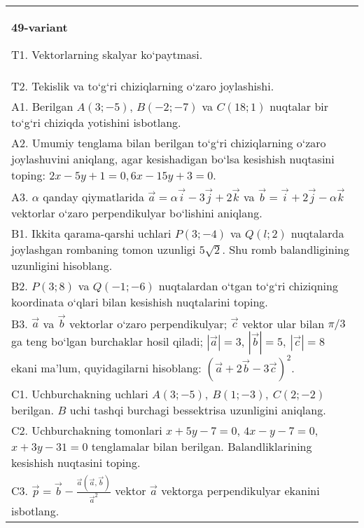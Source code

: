 \documentclass{article}
\begin{document}
\begin{tabular}{m{17cm}}
\textbf{49-variant}
\newline

T1. 
Vektorlarning skalyar ko‘paytmasi.
 \\
T2. 
Tekislik va to‘g‘ri chiziqlarning o‘zaro joylashishi.
 \\
A1. 
Berilgan $A (3; -5) $, $B (-2; -7)$ va
$C (18; 1) $ nuqtalar bir to‘g‘ri chiziqda yotishini isbotlang.
 \\
A2. 
Umumiy tenglama bilan berilgan to‘g‘ri chiziqlarning
o‘zaro joylashuvini aniqlang, agar kesishadigan bo‘lsa kesishish nuqtasini
toping: $2x-5y+1=0, 6x-15y+3=0$.
 \\
A3. 
$\alpha$
qanday qiymatlarida 
$\overrightarrow{a} = \alpha\overrightarrow{i} - 3\overrightarrow{j} + 2\overrightarrow{k}$
va
$\overrightarrow{b} = \overrightarrow{i} + 2\overrightarrow{j} - \alpha\overrightarrow{k}$
vektorlar o‘zaro perpendikulyar bo‘lishini aniqlang.
 \\
B1. 
Ikkita qarama-qarshi uchlari $P (3; -4) $ va $Q (l;2) $ nuqtalarda joylashgan rombaning tomon uzunligi \(5\sqrt{2}\). Shu romb balandligining uzunligini hisoblang.
 \\
B2. 
\(P (3;8) \) va \(Q (-1;-6) \) nuqtalardan o‘tgan
to‘g‘ri chiziqning koordinata o‘qlari bilan kesishish nuqtalarini toping.
 \\
B3. 
$\vec{a}$ va $\vec{b}$ vektorlar o‘zaro perpendikulyar; $\vec{c}$ vektor ular bilan $\pi/3$ ga teng bo‘lgan burchaklar hosil qiladi; $|\vec{a}| = 3$, $|\vec{b}| = 5,\ |\vec{c}| = 8$ ekani ma’lum, quyidagilarni hisoblang:
$ (\vec{a} + 2\vec{b} - 3\vec{c}) ^{2}$.
 \\
C1. 
Uchburchakning uchlari
\(A (3; - 5),\ B (1; - 3),\ C (2; - 2) \) berilgan. $B$ uchi tashqi
burchagi bessektrisa uzunligini aniqlang.
 \\
C2. 
Uchburchakning tomonlari \(x + 5y - 7 = 0\),
\(4x - y - 7 = 0\), \(x + 3y - 31 = 0\) tenglamalar bilan berilgan.
Balandliklarining kesishish nuqtasini toping.
 \\
C3. 
\(\vec{p} = \vec{b} - \frac{\vec{a} (\vec{a},\vec{b}) }{{\vec{a}}^{2}}\) vektor \(\vec{a}\) vektorga perpendikulyar ekanini isbotlang.
 \\

\end{tabular}
\vspace{1cm}
\end{document}
